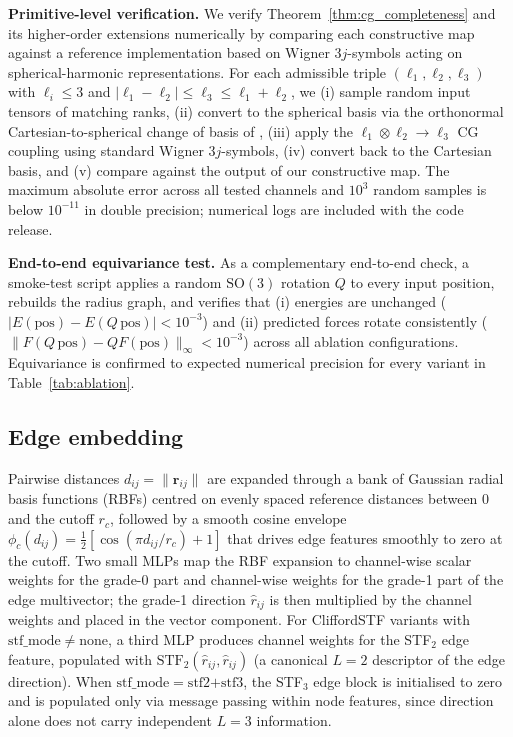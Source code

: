 \textbf{Primitive-level verification.} We verify Theorem~\ref{thm:cg_completeness} and its higher-order extensions numerically by comparing each constructive map against a reference implementation based on Wigner $3j$-symbols acting on spherical-harmonic representations. For each admissible triple $(\ell_1, \ell_2, \ell_3)$ with $\ell_i \leq 3$ and $|\ell_1 - \ell_2| \leq \ell_3 \leq \ell_1 + \ell_2$, we (i) sample random input tensors of matching ranks, (ii) convert to the spherical basis via the orthonormal Cartesian-to-spherical change of basis of \citet{shao2025orthonormal}, (iii) apply the $\ell_1 \otimes \ell_2 \to \ell_3$ CG coupling using standard Wigner $3j$-symbols, (iv) convert back to the Cartesian basis, and (v) compare against the output of our constructive map. The maximum absolute error across all tested channels and $10^3$ random samples is below $10^{-11}$ in double precision; numerical logs are included with the code release.

\textbf{End-to-end equivariance test.} As a complementary end-to-end check, a smoke-test script applies a random $\mathrm{SO}(3)$ rotation $Q$ to every input position, rebuilds the radius graph, and verifies that (i) energies are unchanged ($|E(\mathrm{pos}) - E(Q\,\mathrm{pos})| < 10^{-3}$) and (ii) predicted forces rotate consistently ($\lVert F(Q\,\mathrm{pos}) - Q F(\mathrm{pos})\rVert_\infty < 10^{-3}$) across all ablation configurations. Equivariance is confirmed to expected numerical precision for every variant in Table~\ref{tab:ablation}.

\subsection{Edge embedding}\label{supp:edge_embed}

Pairwise distances $d_{ij} = \lVert\mathbf{r}_{ij}\rVert$ are expanded through a bank of Gaussian radial basis functions (RBFs) centred on evenly spaced reference distances between 0 and the cutoff $r_c$, followed by a smooth cosine envelope $\phi_c(d_{ij}) = \tfrac{1}{2}[\cos(\pi d_{ij}/r_c) + 1]$ that drives edge features smoothly to zero at the cutoff. Two small MLPs map the RBF expansion to channel-wise scalar weights for the grade-0 part and channel-wise weights for the grade-1 part of the edge multivector; the grade-1 direction $\hat{r}_{ij}$ is then multiplied by the channel weights and placed in the vector component. For CliffordSTF variants with $\mathrm{stf\_mode} \neq \text{none}$, a third MLP produces channel weights for the STF$_2$ edge feature, populated with $\mathrm{STF}_2(\hat{r}_{ij}, \hat{r}_{ij})$ (a canonical $L{=}2$ descriptor of the edge direction). When $\mathrm{stf\_mode}=\text{stf2+stf3}$, the STF$_3$ edge block is initialised to zero and is populated only via message passing within node features, since direction alone does not carry independent $L{=}3$ information.

